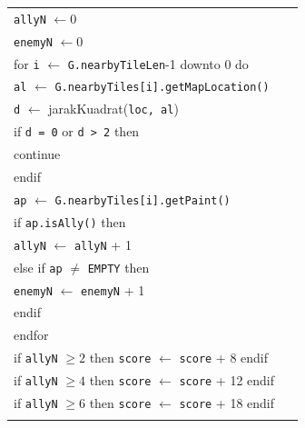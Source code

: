 \documentclass{article}
\newenvironment{pseudobox}
{
\centering
\begin{longtable}{|p{0.94\linewidth}|}
\hline
}
{
\\ \hline
\end{longtable}
\vspace{0.05cm}
}
\begin{document}
\begin{enumerate}[label=\alph*.]
\begin{enumerate}[label=\alph*.]
\begin{pseudobox}
\hspace*{1.5em}\texttt{allyN} $\leftarrow 0$ \\
\hspace*{1.5em}\texttt{enemyN} $\leftarrow 0$ \\

\hspace*{1.5em}for \texttt{i} $\leftarrow$ \texttt{G.nearbyTileLen}-1 downto 0 do \\
\hspace*{3em}\texttt{al} $\leftarrow$ \texttt{G.nearbyTiles[i].getMapLocation()} \\
\hspace*{3em}\texttt{d} $\leftarrow$ jarakKuadrat(\texttt{loc, al}) \\

\hspace*{3em}if \texttt{d = 0} or \texttt{d > 2} then \\
\hspace*{4.5em}continue \\
\hspace*{3em}endif \\

\hspace*{3em}\texttt{ap} $\leftarrow$ \texttt{G.nearbyTiles[i].getPaint()} \\

\hspace*{3em}if \texttt{ap.isAlly()} then \\
\hspace*{4.5em}\texttt{allyN} $\leftarrow$ \texttt{allyN} + 1 \\
\hspace*{3em}else if \texttt{ap} $\neq$ \texttt{EMPTY} then \\
\hspace*{4.5em}\texttt{enemyN} $\leftarrow$ \texttt{enemyN} + 1 \\
\hspace*{3em}endif \\
\hspace*{1.5em}endfor \\

\hspace*{1.5em}if \texttt{allyN} $\geq 2$ then \texttt{score} $\leftarrow$ \texttt{score} + 8 endif \\
\hspace*{1.5em}if \texttt{allyN} $\geq 4$ then \texttt{score} $\leftarrow$ \texttt{score} + 12 endif \\
\hspace*{1.5em}if \texttt{allyN} $\geq 6$ then \texttt{score} $\leftarrow$ \texttt{score} + 18 endif \\


\end{pseudobox}
\end{enumerate}
\end{enumerate}
\end{document}
